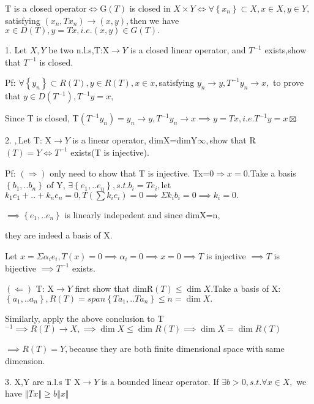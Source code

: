 \documentclass{ctexart}
\begin{document}
T is a closed operator$\iff $G$\left( T\right) $ is closed in $X\times Y\iff
\forall \left\{ x_{n}\right\} \subset X,x\in X,y\in Y,$satisfying $\left(
x_{n},Tx_{n}\right) \rightarrow \left( x,y\right) ,$then we have $x\in
D\left( T\right) ,y=Tx,i.e.\left( x,y\right) \in G\left( T\right) .$

\bigskip

1. Let $X,Y$ be two n.l.s,T:X$\rightarrow Y$ is a closed linear operator,
and $T^{-1}$ exists,show that $T^{-1}$ is closed.

Pf: $\forall \left\{ y_{n}\right\} \subset R\left( T\right) ,y\in R\left(
T\right) ,x\in x,$satisfying $y_{n}\rightarrow y,T^{-1}y_{n}\rightarrow x,$
to prove that $y\in D\left( T^{-1}\right) ,T^{-1}y=x,$

Since T is closed, T$\left( T^{-1}y_{n}\right) =y_{n}\rightarrow
y,T^{-1}y_{n}\rightarrow x\implies y=Tx,i.e.T^{-1}y=x\boxtimes $

2. $,$Let T: X$\rightarrow Y$ is a linear operator, dimX=dimY\TEXTsymbol{<}$%
\infty ,$show that R$\left( T\right) =Y\iff T^{-1}$ exists(T is injective).

Pf: $\left( \Longrightarrow \right) $ only need to show that T is injective.
Tx=0$\Longrightarrow x=0.$Take a basis $\left\{ b_{1},..b_{n}\right\} $ of
Y, $\exists \left\{ e_{1},..e_{n}\right\} ,s.t.b_{i}=Te_{i},$let $%
k_{1}e_{1}+..+k_{n}e_{n}=0,T\left( \sum k_{i}e_{i}\right) =0\implies \Sigma
k_{i}b_{i}=0\implies k_{i}=0.$

$\implies \left\{ e_{1},..e_{n}\right\} $ is linearly indepedent and since
dimX=n,

they are indeed a basis of X.

Let $x=\Sigma \alpha _{i}e_{i},T\left( x\right) =0\implies \alpha
_{i}=0\implies x=0\implies T$ is injective $\implies T$ is bijective $%
\implies T^{-1}$ exists.

$\left( \Longleftarrow \right) $ T: X$\rightarrow Y$ first show that dimR$%
\left( T\right) \leq \dim X.$Take a basis of X:$\left\{
a_{1},..a_{n}\right\} ,R\left( T\right) =span\left\{ Ta_{1},..Ta_{n}\right\}
\leq n=\dim X.$

Similarly, apply the above conclusion to T$^{-1}\implies R\left( T\right)
\rightarrow X,\implies \dim X\leq \dim R\left( T\right) \implies \dim X=\dim
R\left( T\right) $

$\implies R\left( T\right) =Y,$because they are both finite dimensional
space with same dimension.

3. X,Y are n.l.s T X$\rightarrow Y$ is a bounded linear operator. If $%
\exists b>0,s.t.\forall x\in X,$ we have $\left\Vert Tx\right\Vert \geq
b\left\Vert x\right\Vert $
\end{document}
